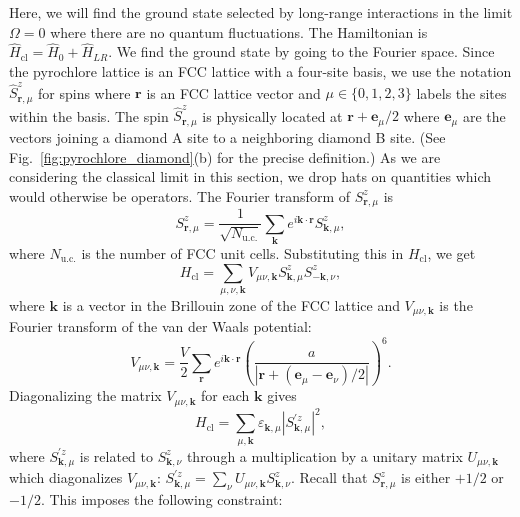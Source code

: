 \documentclass[twocolumn,superscriptaddress,amsmath,amssymb,aps,prx,nofootinbib]{revtex4-2}
\begin{document}
Here, we will find the ground state selected by long-range interactions in the limit $\Omega = 0$ where there are no quantum fluctuations. The Hamiltonian is $\hat{H}_{\text{cl}} = \hat{H}_0 +  \hat{H}_{LR}$. We find the ground state by going to the Fourier space. Since the pyrochlore lattice is an FCC lattice with a four-site basis, we use the notation $\hat{S}^z_{\mathbf{r},\mu}$ for spins where $\mathbf{r}$ is an FCC lattice vector and $\mu \in \{ 0, 1,2,3 \}$ labels the sites within the basis. The spin $\hat{S}^z_{\mathbf{r},\mu}$ is physically located at $\mathbf{r} + \mathbf{e}_\mu/2$ where $\mathbf{e}_\mu$ are the vectors joining a diamond A site to a neighboring diamond B site. (See Fig.~\ref{fig:pyrochlore_diamond}(b) for the precise definition.) As we are considering the classical limit in this section, we drop hats on quantities which would otherwise be operators. The Fourier transform of $S_{\mathbf{r},\mu}^z$ is
\begin{equation}
  S^z_{\mathbf{r},\mu} = \frac{1}{\sqrt{N_{\text{u.c.}}}} \sum_{\mathbf{k}} e^{i \mathbf{k} \cdot \mathbf{r}}S^z_{\mathbf{k},\mu},
\end{equation}
where $N_{\text{u.c.}}$ is the number of FCC unit cells. Substituting this in $H_{\text{cl}}$, we get 
\begin{equation}
  H_{\text{cl} } = \sum_{\mu,\nu,\mathbf{k}} V_{\mu\nu,\mathbf{k}} S^z_{\mathbf{k},\mu} S^z_{-\mathbf{k},\nu},
\end{equation}
where $\mathbf{k}$ is a vector in the Brillouin zone of the FCC lattice and $V_{\mu\nu,\mathbf{k}}$ is the Fourier transform of the van der Waals potential:
\begin{equation} \label{eq:vlr_ft}
V_{\mu\nu,\mathbf{k}} = \frac{V}{2 } \sum_{\mathbf{r}} e^{i \mathbf{k}\cdot \mathbf{r}} \left( \frac{a}{|\mathbf{r} + (\mathbf{e}_\mu - \mathbf{e}_\nu)/2 |} \right)^6.
\end{equation}
Diagonalizing the matrix $V_{\mu\nu,\mathbf{k}}$ for each $\mathbf{k}$ gives
\begin{equation} \label{eq:H_Omega_0_fourier}
  H_\text{cl} = \sum_{\mu, \mathbf{k}} \varepsilon_{\mathbf{k},\mu} |S^{'z}_{\mathbf{k},\mu}|^2,
\end{equation}
where $S^{'z}_{\mathbf{k},\mu}$ is related to $S^z_{\mathbf{k},\nu}$ through a multiplication by a unitary matrix $U_{\mu\nu,\mathbf{k}}$ which diagonalizes $V_{\mu\nu,\mathbf{k}}$: $S^{'z}_{\mathbf{k},\mu} = \sum_\nu U_{\mu\nu,\mathbf{k}} S^z_{\mathbf{k},\nu}$.
Recall that $S^z_{\mathbf{r},\mu}$ is either $+1/2$ or $-1/2$. This imposes the following constraint:
\end{document}
